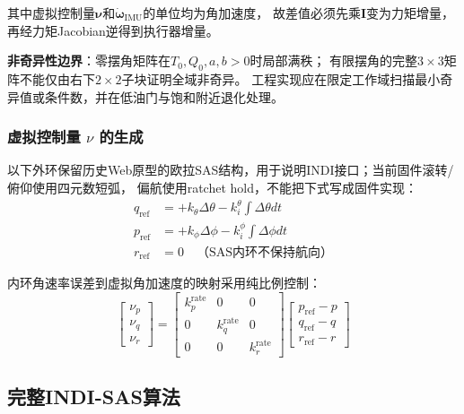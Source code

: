 其中虚拟控制量$\boldsymbol\nu$和$\dot{\boldsymbol\omega}_{\mathrm{IMU}}$的单位均为角加速度，
故差值必须先乘$\mathbf I$变为力矩增量，再经力矩Jacobian逆得到执行器增量。

\textbf{非奇异性边界}：零摆角矩阵在$T_0,Q_0,a,b>0$时局部满秩；
有限摆角的完整$3\times3$矩阵不能仅由右下$2\times2$子块证明全域非奇异。
工程实现应在限定工作域扫描最小奇异值或条件数，并在低油门与饱和附近退化处理。

\subsubsection{虚拟控制量 $\nu$ 的生成}

以下外环保留历史Web原型的欧拉SAS结构，用于说明INDI接口；当前固件滚转/俯仰使用四元数短弧，
偏航使用ratchet hold，不能把下式写成固件实现：
\begin{align}
    q_{\text{ref}} &= +k_\theta\Delta\theta - k_i^\theta\int\Delta\theta dt \label{eq:indi_outer_pitch} \\
    p_{\text{ref}} &= +k_\phi\Delta\phi - k_i^\phi\int\Delta\phi dt \label{eq:indi_outer_roll} \\
    r_{\text{ref}} &= 0 \quad\text{（SAS内环不保持航向）} \label{eq:indi_outer_yaw}
\end{align}

内环角速率误差到虚拟角加速度的映射采用纯比例控制：
\begin{equation}
    \begin{bmatrix} \nu_p \\ \nu_q \\ \nu_r \end{bmatrix}
    =
    \begin{bmatrix} k_p^{\text{rate}} & 0 & 0 \\ 0 & k_q^{\text{rate}} & 0 \\ 0 & 0 & k_r^{\text{rate}} \end{bmatrix}
    \begin{bmatrix} p_{\text{ref}} - p \\ q_{\text{ref}} - q \\ r_{\text{ref}} - r \end{bmatrix}
    \label{eq:indi_nu}
\end{equation}

\subsection{完整INDI-SAS算法}
\label{sec:indi_algorithm}

